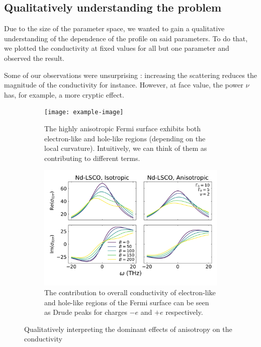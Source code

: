 \subsection{Qualitatively understanding the problem}
Due to the size of the parameter space, 
we wanted to gain a qualitative understanding of the dependence of the profile on said parameters. 
To do that, we plotted the conductivity at fixed values for all but one parameter and observed the result. 

Some of our observations were unsurprising : increasing the scattering reduces the magnitude of the conductivity for instance. 
However, at face value, the power $\nu$ has, for example, a more cryptic effect. \\


\begin{figure}
\centering
\begin{subfigure}{0.4\textwidth}
    \texttt{[image: example-image]}
    \caption{The highly anisotropic Fermi surface exhibits both electron-like and hole-like regions (depending on the local curvature). Intuitively, we can think of them as contributing to different terms.}
    \label{fig:fermi_surface}
\end{subfigure}
\hfill
\begin{subfigure}{0.55\textwidth}
    \includegraphics[width=\textwidth]{figures/NdLSCO_iso_vs_aniso_vary_field_gamma_k_5_nu_2.pdf}
    \caption{The contribution to overall conductivity of electron-like and hole-like regions of the Fermi surface can be seen as Drude peaks for charges $-e$ and $+e$ respectively.}
    \label{fig:iso_vs_aniso_vary_field}
\end{subfigure}
        
\caption{Qualitatively interpreting the dominant effects of anisotropy on the conductivity}
\label{fig:figures}
\end{figure}

